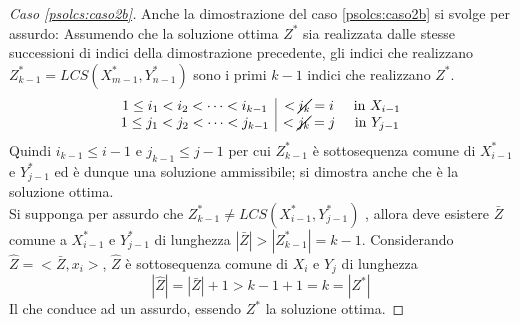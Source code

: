 \begin{proof}[Caso \ref{psolcs:caso2b}]
    Anche la dimostrazione del caso \ref{psolcs:caso2b} si svolge per assurdo:
    Assumendo che la soluzione ottima $Z^*$ sia realizzata dalle stesse successioni di indici della dimostrazione precedente, gli indici che realizzano
    $Z_{k-1}^* = LCS(X_{m-1}^*, Y_{n-1}^*)$
    sono i primi $k-1$ indici che realizzano $Z^*$.
    \[
        \begin{array}{c|cc}
            1 \leq i_1 < i_2 < \cdots < i_{k-1} & < \cancel{i_k} = i  & \text{ in } X_{i-1}
            \\
            1 \leq j_1 < j_2 < \cdots < j_{k-1} & < \cancel{j_k} = j  & \text{ in } Y_{j-1}
        \end{array}
    \]
    Quindi $i_{k-1} \leq i-1$ e $j_{k-1} \leq j-1$
    per cui 
    $Z_{k-1}^* $ è sottosequenza comune di $X_{i-1}^* $ e $ Y_{j-1}^*$ ed è dunque una soluzione ammissibile; si dimostra anche che è la soluzione ottima.
    \\
    Si supponga per assurdo che
    $Z_{k-1}^* \neq LCS(X_{i-1}^*, Y_{j-1}^*)$
    , allora deve esistere $\bar{Z}$ comune a $X_{i-1}^* $ e $ Y_{j-1}^*$ di lunghezza
    $
    | \bar{Z} | > | Z_{k-1}^* | = k-1
    $.
    Considerando $\hat{Z} = < \bar{Z} , x_i > $, $\hat{Z}$ è sottosequenza comune di $X_i$ e $Y_j$ di lunghezza
    \[
        | \hat{Z} | = | \bar{Z} | + 1 > k -1 +1 = k = | Z^* |
    \]
    Il che conduce ad un assurdo, essendo $Z^*$ la soluzione ottima.
\end{proof}

